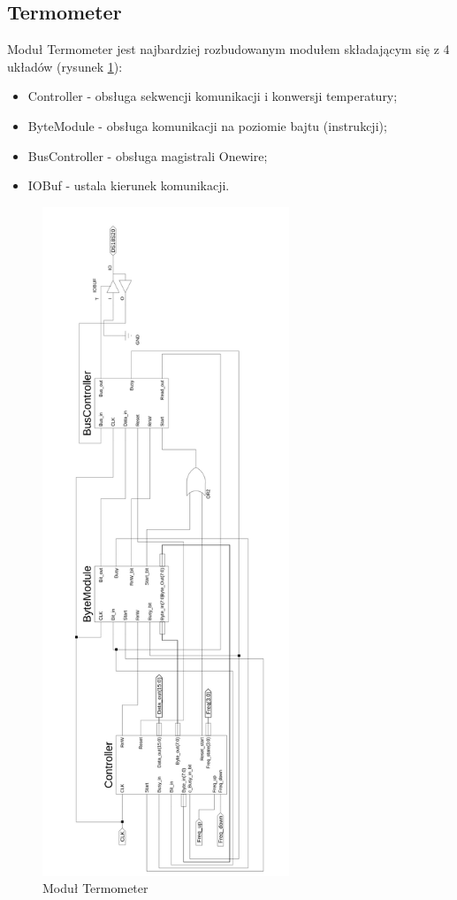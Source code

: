 \documentclass[a4paper]{article}
\begin{document}
\subsection{Termometer}
Moduł Termometer jest najbardziej rozbudowanym modułem składającym się z 4 układów (rysunek \ref{termometer}):
\begin{itemize}
\item Controller - obsługa sekwencji komunikacji i konwersji temperatury;
\item ByteModule - obsługa komunikacji na poziomie bajtu (instrukcji);
\item BusController - obsługa magistrali Onewire;
\item IOBuf - ustala kierunek komunikacji.
\end{itemize}

\begin{figure}[H]
\begin{center}
\includegraphics[height=20cm]{graphics/termometer.png}
\end{center}
\caption{Moduł Termometer}
\label{termometer}
\end{figure}
\end{document}
